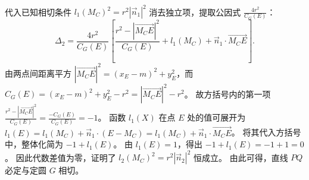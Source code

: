 \begin{solution}
\begin{align*}
\end{align*}
代入已知相切条件 $l_1(M_C)^2 = r^2 |\vec{n}_1|^2$ 消去独立项，提取公因式 $\frac{4r^2}{C_G(E)}$：
\[ \Delta_2 = \frac{4r^2}{C_G(E)} \left[ \frac{r^2 - |\overrightarrow{M_C E}|^2}{C_G(E)} + l_1(M_C) + \vec{n}_1 \cdot \overrightarrow{M_C E} \right]. \]
由两点间距离平方 $|\overrightarrow{M_C E}|^2 = (x_E - m)^2 + y_E^2$，而 $C_G(E) = (x_E - m)^2 + y_E^2 - r^2 = |\overrightarrow{M_C E}|^2 - r^2$。
故方括号内的第一项 $\frac{r^2 - |\overrightarrow{M_C E}|^2}{C_G(E)} = \frac{-C_G(E)}{C_G(E)} = -1$。
函数 $l_1(X)$ 在点 $E$ 处的值可展开为 $l_1(E) = l_1(M_C) + \vec{n}_1 \cdot (E - M_C) = l_1(M_C) + \vec{n}_1 \cdot \overrightarrow{M_C E}$。
将其代入方括号中，整体化简为 $-1 + l_1(E)$。
由 $l_1(E) = 1$，得出 $-1 + l_1(E) = -1 + 1 = 0$。
因此代数差值为零，证明了 $l_2(M_C)^2 = r^2 |\vec{n}_2|^2$ 恒成立。
由此可得，直线 $PQ$ 必定与定圆 $G$ 相切。
\end{solution}


